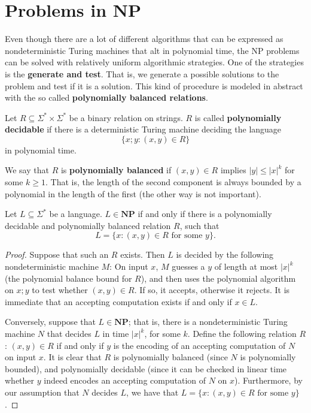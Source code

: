 \documentclass[12pt]{article}
\begin{document}
\newpage
\section{Problems in NP}
Even though there are a lot of different algorithms that can be expressed as nondeterministic Turing machines that alt in polynomial time, the NP problems can be solved with relatively uniform algorithmic strategies. One of the strategies is the \textbf{generate and test}. That is, we generate a possible solutions to the problem and test if it is a solution. This kind of procedure is modeled in abstract with the so called \textbf{polynomially balanced relations}.
\begin{defbox}
Let $R \subseteq \Sigma^* \times \Sigma^*$ be a binary relation on strings. $R$ is called \textbf{polynomially decidable} if there is a deterministic Turing machine deciding the language 
\[
\{x; y : (x, y) \in R\}
\]
in polynomial time. 
\end{defbox}
\begin{defbox}
  We say that $R$ is \textbf{polynomially balanced} if $(x, y) \in R$ implies $|y| \leq |x|^k$ for some $k \geq 1$. That is, the length of the second component is always bounded by a polynomial in the length of the first (the other way is not important).
\end{defbox}
\begin{defbox}[Proposition]
  Let $L \subseteq \Sigma^*$ be a language. $L \in \textbf{NP}$ if and only if there is a polynomially decidable and polynomially balanced relation $R$, such that 
\[
L = \{x : (x, y) \in R \text{ for some } y\}.
\]
\end{defbox}
\begin{proof}
  Suppose that such an $R$ exists. Then $L$ is decided by the following nondeterministic machine $M$: On input $x$, $M$ guesses a $y$ of length at most $|x|^k$ (the polynomial balance bound for $R$), and then uses the polynomial algorithm on $x; y$ to test whether $(x, y) \in R$. If so, it accepts, otherwise it rejects. It is immediate that an accepting computation exists if and only if $x \in L$.

Conversely, suppose that $L \in \textbf{NP}$; that is, there is a nondeterministic Turing machine $N$ that decides $L$ in time $|x|^k$, for some $k$. Define the following relation $R$: $(x, y) \in R$ if and only if $y$ is the encoding of an accepting computation of $N$ on input $x$. It is clear that $R$ is polynomially balanced (since $N$ is polynomially bounded), and polynomially decidable (since it can be checked in linear time whether $y$ indeed encodes an accepting computation of $N$ on $x$). Furthermore, by our assumption that $N$ decides $L$, we have that $L = \{x : (x, y) \in R \text{ for some } y\}$.
\end{proof}
\end{document}
